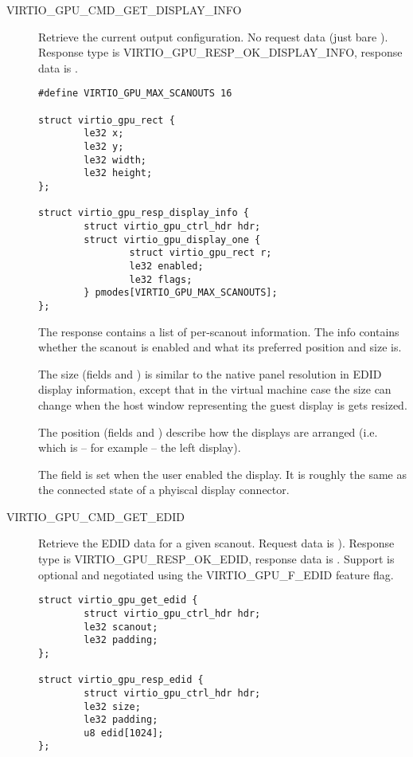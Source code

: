 \begin{description}

\item[VIRTIO_GPU_CMD_GET_DISPLAY_INFO] Retrieve the current output
  configuration.  No request data (just bare ).  Response type is
  VIRTIO_GPU_RESP_OK_DISPLAY_INFO, response data is .

\begin{lstlisting}
#define VIRTIO_GPU_MAX_SCANOUTS 16

struct virtio_gpu_rect {
        le32 x;
        le32 y;
        le32 width;
        le32 height;
};

struct virtio_gpu_resp_display_info {
        struct virtio_gpu_ctrl_hdr hdr;
        struct virtio_gpu_display_one {
                struct virtio_gpu_rect r;
                le32 enabled;
                le32 flags;
        } pmodes[VIRTIO_GPU_MAX_SCANOUTS];
};
\end{lstlisting}

The response contains a list of per-scanout information.  The info
contains whether the scanout is enabled and what its preferred
position and size is.

The size (fields  and ) is similar to the
native panel resolution in EDID display information, except that in
the virtual machine case the size can change when the host window
representing the guest display is gets resized.

The position (fields  and ) describe how the
displays are arranged (i.e. which is -- for example -- the left
display).

The  field is set when the user enabled the display.
It is roughly the same as the connected state of a phyiscal display
connector.

\item[VIRTIO_GPU_CMD_GET_EDID] Retrieve the EDID data for a given
  scanout.  Request data is ).
  Response type is VIRTIO_GPU_RESP_OK_EDID, response data is
  .  Support is optional and
  negotiated using the VIRTIO_GPU_F_EDID feature flag.

\begin{lstlisting}
struct virtio_gpu_get_edid {
        struct virtio_gpu_ctrl_hdr hdr;
        le32 scanout;
        le32 padding;
};

struct virtio_gpu_resp_edid {
        struct virtio_gpu_ctrl_hdr hdr;
        le32 size;
        le32 padding;
        u8 edid[1024];
};
\end{lstlisting}


\end{description}
